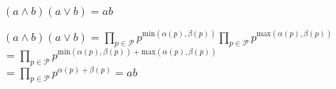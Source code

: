 \begin{crlr}

$(a \wedge b)(a \vee b) = ab$\\

\end{crlr}

\begin{prv}

		$(a \wedge b)(a \vee b) = {\underset{p \in \mathcal{ P}}{\prod}}p^{\text{min}(\alpha(p), \beta(p))}{\underset{p \in \mathcal{ P}}{\prod}}p^{\text{max}(\alpha(p), \beta(p))}$\\
				$= {\underset{p \in \mathcal{ P}}{\prod}}p^{\text{min}(\alpha(p),\beta(p)) + \text{max}(\alpha(p), \beta(p))}$\\
				$={\underset{p \in \mathcal{ P}}{\prod}}p^{\alpha(p) + \beta(p)} = ab$\\

\end{prv}


